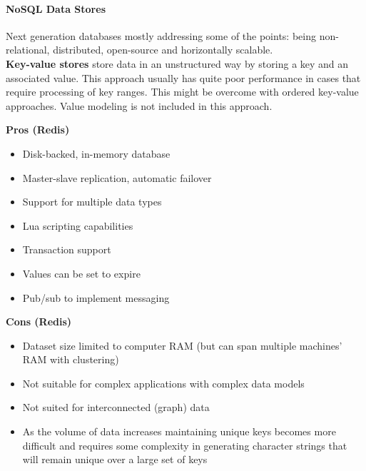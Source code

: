 \paragraph{NoSQL Data Stores}
Next generation databases mostly addressing some of the points: being non- relational, distributed, open-source and horizontally scalable.\\

\textbf{Key-value stores} store data in an unstructured way by storing a key and an associated value.
This approach usually has quite poor performance in cases that require processing of key ranges.
This might be overcome with ordered key-value approaches.
Value modeling is not included in this approach.\\
\begin{minipage}[t]{0.49\textwidth}
  \textbf{Pros (Redis)}
  \begin{itemize}[topsep=0pt,noitemsep]
    \item Disk-backed, in-memory database
    \item Master-slave replication, automatic failover
    \item Support for multiple data types
    \item Lua scripting capabilities
    \item Transaction support
    \item Values can be set to expire
    \item Pub/sub to implement messaging
  \end{itemize}
\end{minipage}
\begin{minipage}[t]{0.49\textwidth}
  \textbf{Cons (Redis)}
  \begin{itemize}[topsep=0pt, noitemsep]
    \item Dataset size limited to computer RAM (but can span multiple machines' RAM with clustering)
    \item Not suitable for complex applications with complex data models
    \item Not suited for interconnected (graph) data
    \item As the volume of data increases maintaining unique keys becomes more difficult and requires some complexity in generating character strings that will remain unique over a large set of keys
  \end{itemize}
\end{minipage}
\vspace{20pt}


